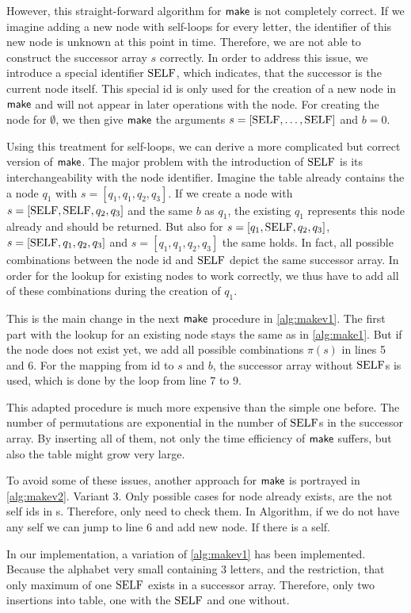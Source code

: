 However, this straight-forward algorithm for $\operatorname{\textsf{make}}$ is not completely correct. If we imagine adding a new node with self-loops for every letter, the identifier of this new node is unknown at this point in time. Therefore, we are not able to construct the successor array $s$ correctly. In order to address this issue, we introduce a special identifier $\mathrm{SELF}$, which indicates, that the successor is the current node itself. This special id is only used for the creation of a new node in $\operatorname{\textsf{make}}$ and will not appear in later operations with the node. 
For creating the node for $\emptyset$, we then give $\operatorname{\textsf{make}}$ the arguments $s = [\mathrm{SELF},\dots,\mathrm{SELF}]$ and $b = 0$.
\par
Using this treatment for self-loops, we can derive a more complicated but correct version of $\operatorname{\textsf{make}}$. The major problem with the introduction of $\mathrm{SELF}$ is its interchangeability with the node identifier. Imagine the table already contains the a node $q_{1}$ with $s=[q_{1},q_{1},q_{2},q_{3}]$. If we create a node with $s=[\mathrm{SELF},\mathrm{SELF},q_{2},q_{3}]$ and the same $b$ as $q_{1}$, the existing $q_{1}$ represents this node already and should be returned. But also for $s=[q_{1},\mathrm{SELF},q_{2},q_{3}]$, $s=[\mathrm{SELF},q_{1},q_{2},q_{3}]$ and $s=[q_{1},q_{1},q_{2},q_{3}]$ the same holds. In fact, all possible combinations between the node id and $\mathrm{SELF}$ depict the same successor array. In order for the lookup for existing nodes to work correctly, we thus have to add all of these combinations during the creation of $q_{1}$.
\par 
This is the main change in the next $\operatorname{\textsf{make}}$ procedure in \autoref{alg:makev1}. The first part with the lookup for an existing node stays the same as in \autoref{alg:make1}. But if the node does not exist yet, we add all possible combinations $\pi(s)$ in lines 5 and 6. For the mapping from id to $s$ and $b$, the successor array without $\mathrm{SELF}$s is used, which is done by the loop from line 7 to 9.
\par
This adapted procedure is much more expensive than the simple one before. The number of permutations are exponential in the number of $\mathrm{SELF}$s in the successor array. By inserting all of them, not only the time efficiency of $\operatorname{\textsf{make}}$ suffers, but also the table might grow very large.
\par
To avoid some of these issues, another approach for $\operatorname{\textsf{make}}$ is portrayed in \autoref{alg:makev2}. 
Variant 3.
Only possible cases for node already exists, are the not self ids in s. Therefore, only need to check them.
In Algorithm, if we do not have any self we can jump to line 6 and add new node. If there is a self. 
\par 
In our implementation, a variation of \autoref{alg:makev1} has been implemented. Because the alphabet very small containing 3 letters, and the restriction, that only maximum of one $\mathrm{SELF}$ exists in a successor array. Therefore, only two insertions into table, one with the $\mathrm{SELF}$ and one without.

